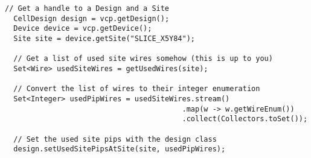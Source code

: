 \begin{lstlisting}[xleftmargin=1.5em, framexleftmargin=1.5em, caption=Code
to transform a set of SiteWires into Site PIPs, label=code:sitePips]
  // Get a handle to a Design and a Site
  CellDesign design = vcp.getDesign();
  Device device = vcp.getDevice();
  Site site = device.getSite("SLICE_X5Y84");

  // Get a list of used site wires somehow (this is up to you)
  Set<Wire> usedSiteWires = getUsedWires(site);

  // Convert the list of wires to their integer enumeration
  Set<Integer> usedPipWires = usedSiteWires.stream()
										 .map(w -> w.getWireEnum())
										 .collect(Collectors.toSet());

  // Set the used site pips with the design class
  design.setUsedSitePipsAtSite(site, usedPipWires);
\end{lstlisting}